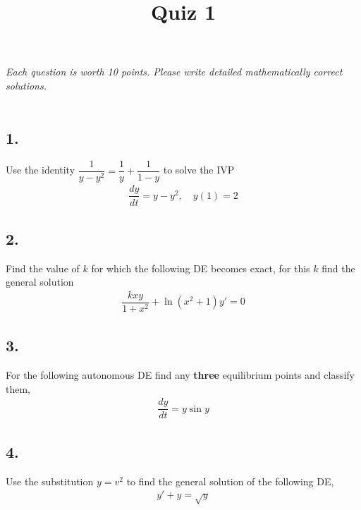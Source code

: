 


\title{Quiz 1}


\maketitle

\thispagestyle{fancy}





\emph{Each question is worth 10 points. Please write detailed mathematically correct solutions.}\\\\





\subsection*{1. }
Use the identity $ \dfrac{1}{y - y ^2}  = \dfrac{1}{y} + \dfrac{1}{1 - y}  $ to solve the IVP
	\begin{align*}
	\dfrac{dy}{dt} = y - y ^ 2, \quad y(1) = 2
	\end{align*}
\vspace{1em}



\subsection*{2. }
Find the value of $k$ for which the following DE becomes exact, for this $k$ find the general solution
\begin{align*}
	\dfrac{kxy}{1 + x^2} + \ln(x^2 + 1)y' = 0
\end{align*}
\vspace{1em}






\subsection*{3. }
For the following autonomous DE find any \textbf{three} equilibrium points and classify them,
	\begin{align*}
	\dfrac{dy}{dt} = y \sin y
	\end{align*}
\vspace{1em}


\subsection*{4. }
Use the substitution $ y = v ^ {2} $  to find the general solution of the following DE,
	\begin{align*}
	y' + y= \sqrt{y}
	\end{align*}
\vspace{1em}








